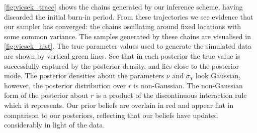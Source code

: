 \cref{fig:vicsek_trace} shows the chains generated by our inference scheme,
having discarded the initial burn-in period. From these trajectories we see
evidence that our sampler has converged: the chains oscillating around fixed
locations with some common variance. The samples generated by these chains are
visualised in \cref{fig:vicsek_hist}. The true parameter values used to
generate the simulated data are shown by vertical green lines. See that in each
posterior the true value is successfully captured by the posterior density, and
lies close to the posterior mode. The posterior densities about the parameters
$\nu$ and $\sigma_Y$ look Gaussian, however, the posterior distribution over
$r$ is non-Gaussian. The non-Gaussian form of the posterior about $r$ is a
product of the discontinuous interaction rule which it represents. Our prior
beliefs are overlain in red and appear flat in comparison to our posteriors,
reflecting that our beliefs have updated considerably in light of the data.

